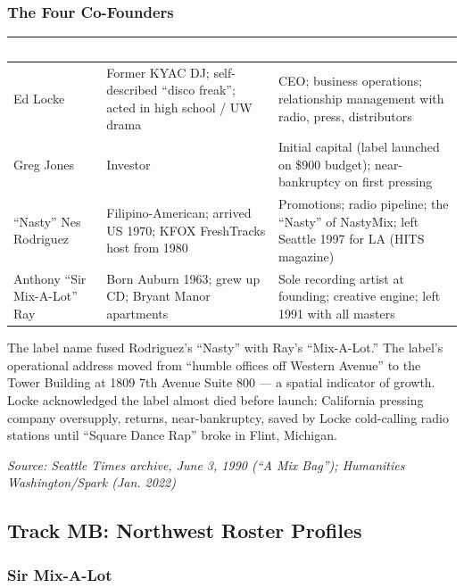 \documentclass[11pt,letterpaper]{article}
\newcommand{\tableheader}[1]{\textbf{\sffamily\textcolor{white}{#1}}}
\begin{document}
\subsubsection{The Four Co-Founders}

\begin{center}
\begin{tabularx}{\textwidth}{L{3.5cm}L{3cm}X}
\toprule
{}
\tableheader{Co-Founder} & \tableheader{Background} & \tableheader{Role at Nastymix} \\
\midrule
Ed Locke & Former KYAC DJ; self-described ``disco freak''; acted in high school / UW drama & CEO; business operations; relationship management with radio, press, distributors \\
Greg Jones & Investor & Initial capital (label launched on \$900 budget); near-bankruptcy on first pressing \\
``Nasty'' Nes Rodriguez & Filipino-American; arrived US 1970; KFOX FreshTracks host from 1980 & Promotions; radio pipeline; the ``Nasty'' of NastyMix; left Seattle 1997 for LA (HITS magazine) \\
Anthony ``Sir Mix-A-Lot'' Ray & Born Auburn 1963; grew up CD; Bryant Manor apartments & Sole recording artist at founding; creative engine; left 1991 with all masters \\
\bottomrule
\end{tabularx}
\end{center}

The label name fused Rodriguez's ``Nasty'' with Ray's ``Mix-A-Lot.'' The label's operational address
moved from ``humble offices off Western Avenue'' to the Tower Building at 1809 7th Avenue Suite 800
--- a spatial indicator of growth. Locke acknowledged the label almost died before launch: California
pressing company oversupply, returns, near-bankruptcy, saved by Locke cold-calling radio stations
until ``Square Dance Rap'' broke in Flint, Michigan.

\textit{Source: Seattle Times archive, June 3, 1990 (``A Mix Bag''); Humanities Washington/Spark (Jan. 2022)}

\subsection{Track MB: Northwest Roster Profiles}

\subsubsection{Sir Mix-A-Lot}
\end{document}
